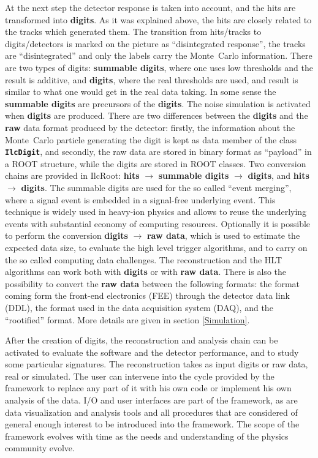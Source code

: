 \documentclass[12pt,a4paper,twoside]{article}
\makeatletter
\newcommand{\class}[1]{\texttt{\textbf{#1}}\xspace}
\newcommand {\MC} {Monte~Carlo\@\xspace}
\makeatother
\begin{document}
At the next step the detector  response is taken into account, and the
hits are transformed into  \textbf{digits}. As it was explained above,
the hits are  closely related to the tracks  which generated them. The
transition  from  hits/tracks to  digits/detectors  is  marked on  the
picture    as    ``disintegrated    response'',   the    tracks    are
``disintegrated''  and  only the  labels  carry  the \MC  information.
There  are two types  of digits:  \textbf{summable digits},  where one
uses  low thresholds  and the  result is  additive, and  {\bf digits},
where the real thresholds are used,  and result is similar to what one
would get  in the real  data taking. In  some sense the  {\bf summable
digits} are precursors of the \textbf{digits}. The noise simulation is
activated when \textbf{digits} are produced. There are two differences
between the \textbf{digits} and  the \textbf{raw} data format produced
by  the detector:  firstly,  the information  about  the \MC  particle
generating  the   digit  is   kept  as  data   member  of   the  class
\class{IlcDigit},  and secondly,  the raw  data are  stored  in binary
format as ``payload'' in a ROOT structure, while the digits are stored
in  ROOT  classes. Two  conversion  chains  are  provided in  IlcRoot:
\textbf{hits}  $\to$ \textbf{summable  digits}  $\to$ \textbf{digits},
and \textbf{hits} $\to$ \textbf{digits}.  The summable digits are used
for the so called ``event  merging'', where a signal event is embedded
in a  signal-free underlying event.  This technique is widely  used in
heavy-ion  physics and  allows  to reuse  the  underlying events  with
substantial economy of computing resources.  Optionally it is possible
to  perform the  conversion \textbf{digits}  $\to$  \textbf{raw data},
which is used to estimate the expected data size, to evaluate the high
level trigger algorithms, and to carry on the so called computing data
challenges.  The  reconstruction and the HLT algorithms  can work both
with  \textbf{digits} or  with \textbf{raw  data}. There  is  also the
possibility  to convert  the \textbf{raw  data} between  the following
formats:  the  format  coming  form the  front-end  electronics  (FEE)
through  the detector data  link (DDL),  the format  used in  the data
acquisition system  (DAQ), and the ``rootified''  format. More details
are given in section \ref{Simulation}.

After the  creation of digits,  the reconstruction and  analysis chain
can  be   activated  to  evaluate   the  software  and   the  detector
performance,   and   to  study   some   particular  signatures.    The
reconstruction takes as  input digits or raw data,  real or simulated.
The user  can intervene  into the cycle  provided by the  framework to
replace any part of it with his own code or implement his own analysis
of the data. I/O and user interfaces are part of the framework, as are
data  visualization and  analysis tools  and all  procedures  that are
considered  of  general enough  interest  to  be  introduced into  the
framework. The scope  of the framework evolves with  time as the needs
and understanding of the physics community evolve.
\end{document}
